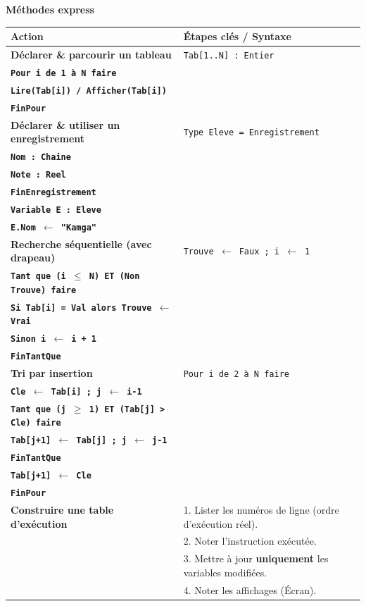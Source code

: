 \documentclass[11pt]{article}
\begin{document}
\begin{bilan}
\textbf{Méthodes express}
\begin{center}
\begin{tabularx}{\linewidth}{|>{\bfseries}l|X|}\hline
\textbf{Action} & \textbf{Étapes clés / Syntaxe} \\\hline
Déclarer \& parcourir un tableau & \texttt{Tab[1..N] : Entier} \\ \texttt{Pour i de 1 à N faire} \\ \quad \texttt{Lire(Tab[i]) / Afficher(Tab[i])} \\ \texttt{FinPour} \\\hline
Déclarer \& utiliser un enregistrement & \texttt{Type Eleve = Enregistrement} \\ \quad \texttt{Nom : Chaine} \\ \quad \texttt{Note : Reel} \\ \texttt{FinEnregistrement} \\ \texttt{Variable E : Eleve} \\ \quad \texttt{E.Nom $\leftarrow$ "Kamga"} \\\hline
Recherche séquentielle (avec drapeau) & \texttt{Trouve $\leftarrow$ Faux ; i $\leftarrow$ 1} \\ \texttt{Tant que (i $\le$ N) ET (Non Trouve) faire} \\ \quad \texttt{Si Tab[i] = Val alors Trouve $\leftarrow$ Vrai} \\ \quad \texttt{Sinon i $\leftarrow$ i + 1} \\ \texttt{FinTantQue} \\\hline
Tri par insertion & \texttt{Pour i de 2 à N faire} \\ \quad \texttt{Cle $\leftarrow$ Tab[i] ; j $\leftarrow$ i-1} \\ \quad \texttt{Tant que (j $\ge$ 1) ET (Tab[j] > Cle) faire} \\ \quad \quad \texttt{Tab[j+1] $\leftarrow$ Tab[j] ; j $\leftarrow$ j-1} \\ \quad \texttt{FinTantQue} \\ \quad \texttt{Tab[j+1] $\leftarrow$ Cle} \\ \texttt{FinPour} \\\hline
Construire une table d'exécution & 1. Lister les numéros de ligne (ordre d'exécution réel). \\
& 2. Noter l'instruction exécutée. \\
& 3. Mettre à jour \textbf{uniquement} les variables modifiées. \\
& 4. Noter les affichages (Écran). \\\hline
\end{tabularx}
\end{center}


\end{bilan}
\end{document}
